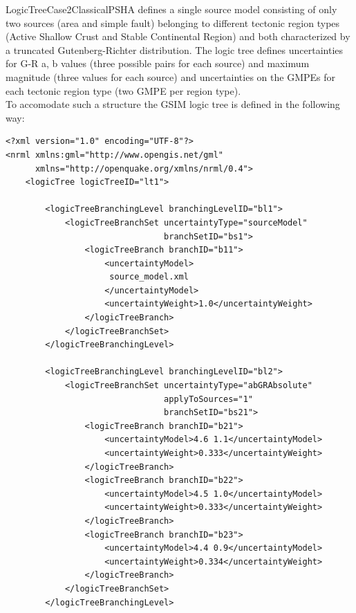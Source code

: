 LogicTreeCase2ClassicalPSHA defines a single source model consisting of only two sources (area and simple fault) belonging to different
tectonic region types (Active Shallow Crust and Stable Continental Region) and both characterized by a truncated Gutenberg-Richter distribution.
The logic tree defines uncertainties for G-R a, b values (three possible pairs for each source) and maximum magnitude (three values for each source) 
and uncertainties on the GMPEs for each tectonic region type (two GMPE per region type).\\
To accomodate such a structure the GSIM logic tree is defined in the following way:
\begin{Verbatim}[frame=single, commandchars=\\\{\}, fontsize=\normalsize]
<?xml version="1.0" encoding="UTF-8"?>
<nrml xmlns:gml="http://www.opengis.net/gml"
      xmlns="http://openquake.org/xmlns/nrml/0.4">
    <logicTree logicTreeID="lt1">

        <logicTreeBranchingLevel branchingLevelID="bl1">
            <logicTreeBranchSet uncertaintyType="sourceModel"
                                branchSetID="bs1">
                <logicTreeBranch branchID="b11">
                    <uncertaintyModel>
                     source_model.xml
                    </uncertaintyModel>
                    <uncertaintyWeight>1.0</uncertaintyWeight>
                </logicTreeBranch>
            </logicTreeBranchSet>
        </logicTreeBranchingLevel>

        <logicTreeBranchingLevel branchingLevelID="bl2">
            <logicTreeBranchSet uncertaintyType="abGRAbsolute"
                                applyToSources="1"
                                branchSetID="bs21">
                <logicTreeBranch branchID="b21">
                    <uncertaintyModel>4.6 1.1</uncertaintyModel>
                    <uncertaintyWeight>0.333</uncertaintyWeight>
                </logicTreeBranch>
                <logicTreeBranch branchID="b22">
                    <uncertaintyModel>4.5 1.0</uncertaintyModel>
                    <uncertaintyWeight>0.333</uncertaintyWeight>
                </logicTreeBranch>
                <logicTreeBranch branchID="b23">
                    <uncertaintyModel>4.4 0.9</uncertaintyModel>
                    <uncertaintyWeight>0.334</uncertaintyWeight>
                </logicTreeBranch>
            </logicTreeBranchSet>
        </logicTreeBranchingLevel>


\end{Verbatim}
